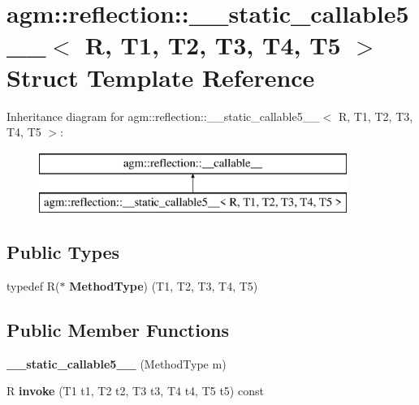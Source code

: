 \hypertarget{structagm_1_1reflection_1_1____static__callable5____}{}\section{agm\+:\+:reflection\+:\+:\+\_\+\+\_\+static\+\_\+callable5\+\_\+\+\_\+$<$ R, T1, T2, T3, T4, T5 $>$ Struct Template Reference}
\label{structagm_1_1reflection_1_1____static__callable5____}
Inheritance diagram for agm\+:\+:reflection\+:\+:\+\_\+\+\_\+static\+\_\+callable5\+\_\+\+\_\+$<$ R, T1, T2, T3, T4, T5 $>$\+:\begin{figure}[H]
\begin{center}
\leavevmode
\includegraphics[height=2.000000cm]{structagm_1_1reflection_1_1____static__callable5____}
\end{center}
\end{figure}
\subsection*{Public Types}
\begin{DoxyCompactItemize}
\item 
typedef R($\ast$ {\bfseries Method\+Type}) (T1, T2, T3, T4, T5)\hypertarget{structagm_1_1reflection_1_1____static__callable5_____a68d83f9dafb98241b9829fee95c1d2b9}{}\label{structagm_1_1reflection_1_1____static__callable5_____a68d83f9dafb98241b9829fee95c1d2b9}

\end{DoxyCompactItemize}
\subsection*{Public Member Functions}
\begin{DoxyCompactItemize}
\item 
{\bfseries \+\_\+\+\_\+static\+\_\+callable5\+\_\+\+\_\+} (Method\+Type m)\hypertarget{structagm_1_1reflection_1_1____static__callable5_____a0958d80454aff388555b9c894c6761e9}{}\label{structagm_1_1reflection_1_1____static__callable5_____a0958d80454aff388555b9c894c6761e9}

\item 
R {\bfseries invoke} (T1 t1, T2 t2, T3 t3, T4 t4, T5 t5) const \hypertarget{structagm_1_1reflection_1_1____static__callable5_____abeff1ce062c65496a4336eaeecd8060b}{}\label{structagm_1_1reflection_1_1____static__callable5_____abeff1ce062c65496a4336eaeecd8060b}

\end{DoxyCompactItemize}
